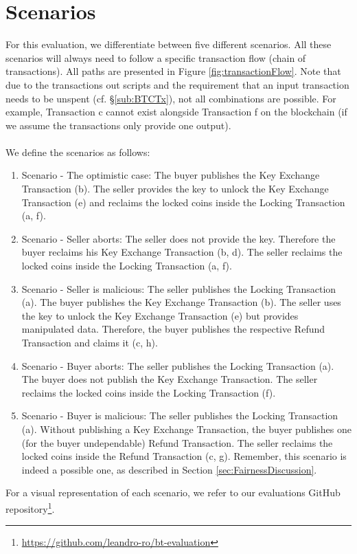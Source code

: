 \documentclass{cacthesis}
\begin{document}
	    \section{Scenarios}
	    For this evaluation, we differentiate between five different scenarios. All these scenarios will always need to follow a specific transaction flow (chain of transactions). All paths are presented in Figure \ref{fig:transactionFlow}. Note that due to the transactions out scripts and the requirement that an input transaction needs to be unspent (cf. §\ref{sub:BTCTx}), not all combinations are possible. For example, Transaction c cannot exist alongside Transaction f on the blockchain (if we assume the transactions only provide one output).
	    \\\\
	    We define the scenarios as follows:
	    \begin{enumerate}
            \item Scenario - The optimistic case: The buyer publishes the Key Exchange Transaction (b). The seller provides the key to unlock the Key Exchange Transaction (e) and reclaims the locked coins inside the Locking Transaction (a, f).

            \item Scenario - Seller aborts: The seller does not provide the key. Therefore the buyer reclaims his Key Exchange Transaction (b, d). The seller reclaims the locked coins inside the Locking Transaction (a, f).

            \item Scenario - Seller is malicious: The seller publishes the Locking Transaction (a). The buyer publishes the Key Exchange Transaction (b). The seller uses the key to unlock the Key Exchange Transaction (e) but provides manipulated data. Therefore, the buyer publishes the respective Refund Transaction and claims it (c, h).
            
            \item Scenario - Buyer aborts: The seller publishes the Locking Transaction (a). The buyer does not publish the Key Exchange Transaction. The seller reclaims the locked coins inside the Locking Transaction (f).
            
            \item Scenario - Buyer is malicious: The seller publishes the Locking Transaction (a). Without publishing a Key Exchange Transaction, the buyer publishes one (for the buyer undependable) Refund Transaction. The seller reclaims the locked coins inside the Refund Transaction (c, g). Remember, this scenario is indeed a possible one, as described in Section \ref{sec:FairnessDiscussion}.
        \end{enumerate}
	    For a visual representation of each scenario, we refer to our evaluations GitHub repository\footnote{\url{https://github.com/leandro-ro/bt-evaluation}}.
	    
\end{document}
